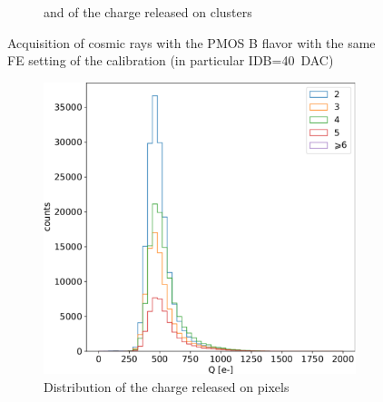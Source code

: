 \begin{figure}
\begin{subfigure}[b]{0.49\textwidth}
                \caption{and of the charge released on clusters}
                \label{fig:CR_cluster}
            \end{subfigure}
            \caption{Acquisition of cosmic rays with the PMOS B flavor with the same FE setting of the calibration (in particular IDB=\SI{40}{DAC})}
            \label{fig:spectrum_cosmic_rays}
        \end{figure}  

        \begin{figure}
            \centering
            \begin{subfigure}[b]{0.49\textwidth}
                \centering
                \includegraphics[width=\linewidth]{figures/charaterization/Sr90_spectrum_per_pixel.pdf}
                \caption{Distribution of the charge released on pixels}
                \label{fig:Sr90_pixel}
            \end{subfigure}
            \hfill
            \begin{subfigure}[b]{0.49\textwidth}
                \centering

\end{subfigure}
\end{figure}

